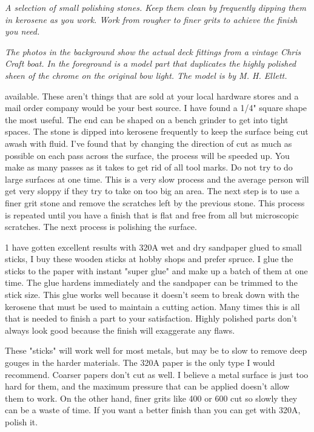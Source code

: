 \bigskip
\textit{A selection of small polishing stones. Keep them clean by frequently
dipping them in kerosene as you work. Work from rougher to finer grits to
achieve the finish you need.}
\bigskip

\textit{The photos in the background show the actual deck fittings from a
vintage Chris Craft boat. In the foreground is a model part that duplicates the
highly polished sheen of the chrome on the original bow light. The model is by
M. H. Ellett.}
\bigskip

available. These aren't things that are sold at your local hardware stores and a
mail order company would be your best source. I have found a 1/4" square shape
the most useful. The end can be shaped on a bench grinder to get into tight
spaces. The stone is dipped into kerosene frequently to keep the surface being
cut awash with fluid. I've found that by changing the direction of cut as much
as possible on each pass across the surface, the process will be speeded up. You
make as many passes as it takes to get rid of all tool marks. Do not try to do
large surfaces at one time. This is a very slow process and the average person
will get very sloppy if they try to take on too big an area. The next step is to
use a finer grit stone and remove the scratches left by the previous stone. This
process is repeated until you have a finish that is flat and free from all but
microscopic scratches. The next process is polishing the surface.


1 have gotten excellent results with 320A wet and dry sandpaper glued to small
sticks, I buy these wooden sticks at hobby shops and prefer spruce. I glue the
sticks to the paper with instant "super glue" and make up a batch of them at one
time. The glue hardens immediately and the sandpaper can be trimmed to the stick
size. This glue works well because it doesn't seem to break down with the
kerosene that must be used to maintain a cutting action. Many times this is all
that is needed to finish a part to your satisfaction. Highly polished parts
don't always look good because the finish will exaggerate any flaws.

These "sticks" will work well for most metals, but may be to slow to remove deep
gouges in the harder materials. The 320A paper is the only type I would
recommend. Coarser papers don't cut as well. I believe a metal surface is just
too hard for them, and the maximum pressure that can be applied doesn't allow
them to work. On the other hand, finer grits like 400 or 600 cut so slowly they
can be a waste of time. If you want a better finish than you can get with 320A,
polish it.

